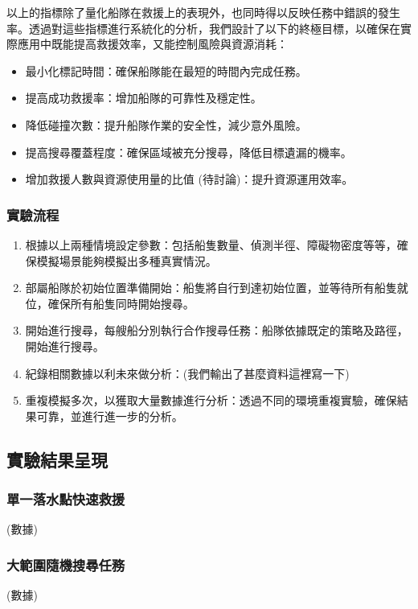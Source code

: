\documentclass[12pt,a4paper]{ctexart}
\begin{document}
以上的指標除了量化船隊在救援上的表現外，也同時得以反映任務中錯誤的發生率。透過對這些指標進行系統化的分析，我們設計了以下的終極目標，以確保在實際應用中既能提高救援效率，又能控制風險與資源消耗：
\begin{itemize}
    \item 最小化標記時間：確保船隊能在最短的時間內完成任務。
    \item 提高成功救援率：增加船隊的可靠性及穩定性。
    \item 降低碰撞次數：提升船隊作業的安全性，減少意外風險。
    \item 提高搜尋覆蓋程度：確保區域被充分搜尋，降低目標遺漏的機率。
    \item 增加救援人數與資源使用量的比值 (待討論)：提升資源運用效率。
\end{itemize}

\subsubsection{實驗流程}
\begin{enumerate}
    \item 根據以上兩種情境設定參數：包括船隻數量、偵測半徑、障礙物密度等等，確保模擬場景能夠模擬出多種真實情況。
    \item 部屬船隊於初始位置準備開始：船隻將自行到達初始位置，並等待所有船隻就位，確保所有船隻同時開始搜尋。
    \item 開始進行搜尋，每艘船分別執行合作搜尋任務：船隊依據既定的策略及路徑，開始進行搜尋。
    \item 紀錄相關數據以利未來做分析：(我們輸出了甚麼資料這裡寫一下)
    \item 重複模擬多次，以獲取大量數據進行分析：透過不同的環境重複實驗，確保結果可靠，並進行進一步的分析。
\end{enumerate}

\subsection{實驗結果呈現}
\subsubsection{單一落水點快速救援}
(數據)

\subsubsection{大範圍隨機搜尋任務}
(數據)
\end{document}
